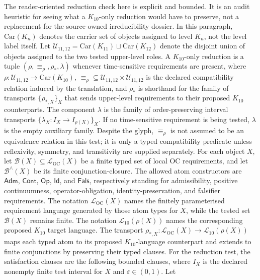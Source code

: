 The reader-oriented reduction check here is explicit and bounded. It is an
audit heuristic for seeing what a \(K_{10}\)-only reduction would have to
preserve, not a replacement for the source-owned irreducibility dossier. In this paragraph,
\(\mathrm{Car}(K_n)\) denotes the carrier set of objects assigned to level \(K_n\), not the
level label itself. Let
\(\mathcal{U}_{11,12}=\mathrm{Car}(K_{11})\sqcup \mathrm{Car}(K_{12})\) denote the disjoint union of
objects assigned to the two tested upper-level roles. A \(K_{10}\)-only
reduction is a tuple \((\rho,\equiv_{\rho},\rho_{\ast},\lambda)\) whenever
time-sensitive requirements are present, where
\(\rho:\mathcal{U}_{11,12}\to \mathrm{Car}(K_{10})\),
\(\equiv_{\rho}\subseteq\mathcal{U}_{11,12}\times\mathcal{U}_{11,12}\) is the
declared compatibility relation induced by the translation, and
\(\rho_{\ast}\) is shorthand for the family of transports
\(\{\rho_{\ast,X}\}_X\) that sends upper-level requirements to their proposed
\(K_{10}\) counterparts. The component \(\lambda\) is the family of
order-preserving interval transports
\(\{\lambda_X:I_X\to I_{\rho(X)}\}_X\). If no time-sensitive requirement is
being tested, \(\lambda\) is the empty auxiliary family. Despite the glyph, \(\equiv_{\rho}\) is not assumed
to be an equivalence relation in this test; it is only a typed compatibility
predicate unless reflexivity, symmetry, and transitivity are supplied
separately. For each object \(X\), let
\(\mathcal{B}(X)\subseteq\mathcal{L}_{\mathrm{OC}}(X)\) be a finite typed
set of local OC requirements, and let \(\mathcal{B}^{\wedge}(X)\) be its
finite conjunction-closure. The allowed atom constructors are
\(\mathsf{Adm}\), \(\mathsf{Cont}\), \(\mathsf{Op}\), \(\mathsf{Id}\), and
\(\mathsf{Fals}\), respectively standing for admissibility, positive
continuumness, operator-obligation, identity-preservation, and falsifier
requirements. The notation
\(\mathcal{L}_{\mathrm{OC}}(X)\) names the finitely parameterised
requirement language generated by those atom types for \(X\), while the tested
set \(\mathcal{B}(X)\) remains finite. The notation \(\mathcal{L}_{10}(\rho(X))\)
names the corresponding proposed \(K_{10}\) target language. The transport
\(\rho_{\ast,X}:\mathcal{L}_{\mathrm{OC}}(X)\to\mathcal{L}_{10}(\rho(X))\)
maps each typed atom to its proposed \(K_{10}\)-language counterpart and
extends to finite conjunctions by preserving their typed clauses. For the
reduction test, the satisfaction clauses are the following bounded clauses,
where \(I_X\) is the declared nonempty finite test interval for \(X\) and
\(\varepsilon\in(0,1)\). Let
